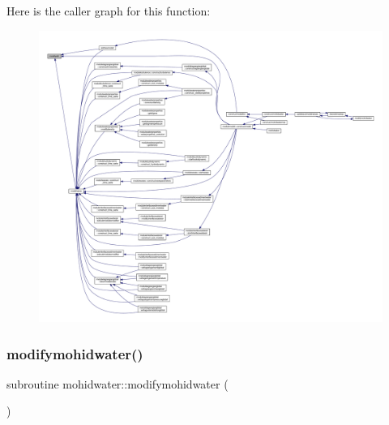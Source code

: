 Here is the caller graph for this function\+:\nopagebreak
\begin{figure}[H]
\begin{center}
\leavevmode
\includegraphics[width=350pt]{_main_8_f90_ada5b220b45dcba73a75264dcde43e3bd_icgraph}
\end{center}
\end{figure}
\mbox{\label{_main_8_f90_a98b6185e00bdaa093569c6645482e68b}} 
\subsubsection{\texorpdfstring{modifymohidwater()}{modifymohidwater()}}
{\footnotesize\ttfamily subroutine mohidwater\+::modifymohidwater (\begin{DoxyParamCaption}{ }\end{DoxyParamCaption})}

